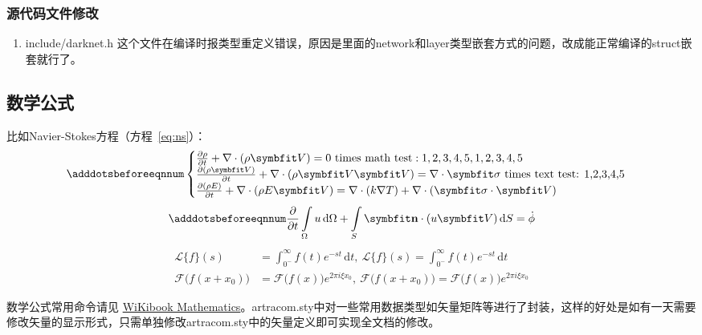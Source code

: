 \subsubsection{源代码文件修改}
\begin{enumerate}
    \item include/darknet.h
    这个文件在编译时报类型重定义错误，原因是里面的network和layer类型嵌套方式的问题，改成能正常编译的struct嵌套就行了。
\end{enumerate}

\subsection{数学公式}

比如Navier-Stokes方程（方程~\eqref{eq:ns}）：
\begin{equation} \label{eq:ns}
    \adddotsbeforeeqnnum%
    \begin{cases}
        \frac{\partial \rho}{\partial t} + \nabla\cdot(\rho\Vector{V}) = 0 \ \mathrm{times\ math\ test: 1,2,3,4,5}, 1,2,3,4,5\\
        \frac{\partial (\rho\Vector{V})}{\partial t} + \nabla\cdot(\rho\Vector{V}\Vector{V}) = \nabla\cdot\Tensor{\sigma} \ \text{times text test: 1,2,3,4,5}\\
        \frac{\partial (\rho E)}{\partial t} + \nabla\cdot(\rho E\Vector{V}) = \nabla\cdot(k\nabla T) + \nabla\cdot(\Tensor{\sigma}\cdot\Vector{V})
    \end{cases}
\end{equation}
\begin{equation}
    \adddotsbeforeeqnnum%
    \frac{\partial }{\partial t}\int\limits_{\Omega} u \, \mathrm{d}\Omega + \int\limits_{S} \unitVector{n}\cdot(u\Vector{V}) \, \mathrm{d}S = \dot{\phi}
\end{equation}
\[
    \begin{split}
        \mathcal{L} \{f\}(s) &= \int _{0^{-}}^{\infty} f(t) e^{-st} \, \mathrm{d}t, \ 
        \mathscr{L} \{f\}(s) = \int _{0^{-}}^{\infty} f(t) e^{-st} \, \mathrm{d}t\\
        \mathcal{F} {\bigl (} f(x+x_{0}) {\bigr )} &= \mathcal{F} {\bigl (} f(x) {\bigr )} e^{2\pi i\xi x_{0}}, \ 
        \mathscr{F} {\bigl (} f(x+x_{0}) {\bigr )} = \mathscr{F} {\bigl (} f(x) {\bigr )} e^{2\pi i\xi x_{0}}
    \end{split}
\]

数学公式常用命令请见 \href{https://en.wikibooks.org/wiki/LaTeX/Mathematics}{WiKibook Mathematics}。artracom.sty中对一些常用数据类型如矢量矩阵等进行了封装，这样的好处是如有一天需要修改矢量的显示形式，只需单独修改artracom.sty中的矢量定义即可实现全文档的修改。

